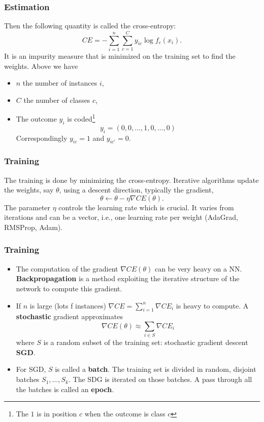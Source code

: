 \begin{frame}
\frametitle{Estimation}
Then the following quantity is called the cross-entropy:
$$
CE = - \sum_{i=1}^n \sum_{c=1}^C y_{ic}\log f_c(x_i).
$$
It is an impurity measure that is minimized on the training set to find the weights.
Above we have
\begin{itemize}
\item $n$ the number of instances $i$, 
\item $C$ the number of classes $c$,
\item The outcome $y_i$ is coded\footnote{The $1$ is in position $c$ when the outcome is class $c$} 
$$
y_{i}=(0, 0, \ldots, 1, 0, \ldots, 0)
$$ 
Correspondingly $y_{ic}=1$ and $y_{ic'}=0$.
\end{itemize}

\end{frame}
\begin{frame}
\frametitle{Training}
The training is done by minimizing the cross-entropy. Iterative algorithms update the weights, say $\theta$, using a descent direction, typically the gradient,
$$
\theta \leftarrow \theta - \eta \nabla CE(\theta).
$$ 
The parameter $\eta$ controls the learning rate which is crucial. It varies from iterations and can be a vector, i.e., one learning rate per weight (AdaGrad, RMSProp, Adam). 
\end{frame}
\begin{frame}
\frametitle{Training}
\begin{itemize}
\item The computation of the gradient $\nabla CE(\theta)$ can be very heavy on a NN. {\bf Backpropagation} is a method exploiting the iterative structure of the network to compute this gradient. 
\item If $n$ is large (lots f instances) $\nabla CE=\sum_{i=1}^n \nabla CE_i$ is heavy to compute. A {\bf stochastic} gradient approximates 
$$
\nabla CE(\theta) \approx \sum_{i \in S} \nabla CE_i
$$ 
where $S$ is a random subset of the training set: stochastic gradient descent {\bf SGD}.
\item For SGD, $S$ is called a {\bf batch}. The training set is divided in random, disjoint batches $S_1,\ldots,S_k$. The SDG is iterated on those batches. A pass through all the batches is called an {\bf epoch}.
\end{itemize} 
\end{frame}
